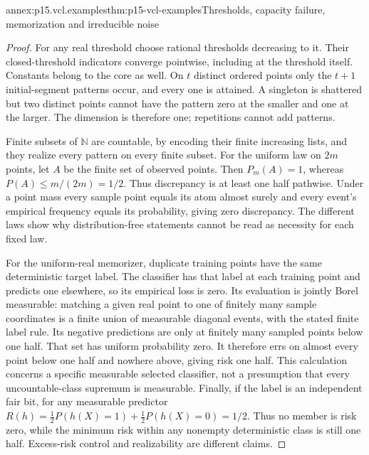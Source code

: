 \begin{annexitem}{annex:p15.vcl.examples}{thm:p15-vcl-examples}{Thresholds, capacity failure, memorization and irreducible noise}
\begin{proof}
For any real threshold choose rational thresholds decreasing to it.
Their closed-threshold indicators converge pointwise, including at the
threshold itself. Constants belong to the core as well. On \(t\) distinct
ordered points only the \(t+1\) initial-segment patterns occur, and every
one is attained. A singleton is shattered but two distinct points cannot
have the pattern zero at the smaller and one at the larger. The dimension
is therefore one; repetitions cannot add patterns.

Finite subsets of \(\mathbb N\) are countable, by encoding their finite
increasing lists, and they realize every pattern on every finite subset.
For the uniform law on \(2m\) points, let \(A\) be the finite set of
observed points. Then \(P_m(A)=1\), whereas \(P(A)\leq m/(2m)=1/2\).
Thus discrepancy is at least one half pathwise. Under a point mass every
sample point equals its atom almost surely and every event's empirical
frequency equals its probability, giving zero discrepancy. The different
laws show why distribution-free statements cannot be read as necessity
for each fixed law.

For the uniform-real memorizer, duplicate training points have the same
deterministic target label. The classifier has that label at each training
point and predicts one elsewhere, so its empirical loss is zero. Its
evaluation is jointly Borel measurable: matching a given real point to
one of finitely many sample coordinates is a finite union of measurable
diagonal events, with the stated finite label rule. Its negative predictions
are only at finitely many sampled points below one half. That set has
uniform probability zero. It therefore errs on almost every point below
one half and nowhere above, giving risk one half. This calculation concerns
a specific measurable selected classifier, not a presumption that every
uncountable-class supremum is measurable.
Finally, if the label is an independent fair bit, for any measurable
predictor
\(R(h)=\tfrac12P(h(X)=1)+\tfrac12P(h(X)=0)=1/2\).
Thus no member is risk zero, while the minimum risk within any nonempty
deterministic class is still one half. Excess-risk control and realizability
are different claims.
\end{proof}
\end{annexitem}
